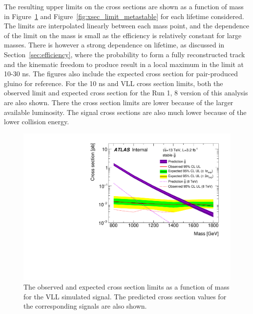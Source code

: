 The resulting upper limits on the cross sections are shown as a function of mass in Figure~\ref{fig:xsec_limit_stable} and Figure~\ref{fig:xsec_limit_metastable} for each lifetime considered.
The limits are interpolated linearly between each mass point, and the dependence of the limit on the mass is small as the efficiency is relatively constant for large \rhadron masses.
There is however a strong dependence on lifetime, as discussed in Section~\ref{sec:efficiency}, where the probability to form a fully reconstructed track and the kinematic freedom to produce \met result in a local maximum in the limit at 10-30 ns.
The figures also include the expected cross section for pair-produced gluino \rhadrons for reference.
For the 10 ns and \ac{VLL} cross section limits, both the observed limit and expected cross section for the Run 1, 8 \TeV version of this analysis are also shown.
There the cross section limits are lower because of the larger available luminosity. 
The signal cross sections are also much lower because of the lower collision energy.

\begin{figure}
\centering
\includegraphics[width=\fullfig]{figures/xsec_limit_stable.pdf}
\caption{The observed and expected cross section limits as a function of mass for the \ac{VLL} simulated signal. The predicted cross section values for the corresponding signals are also shown. }
\label{fig:xsec_limit_stable}
\end{figure}

